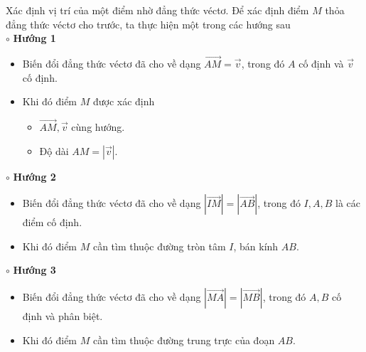 \begin{dang}{Xác định vị trí của một điểm nhờ đẳng thức véctơ.}
    Để xác định điểm $M$ thỏa đẳng thức véctơ cho trước, ta thực hiện một trong các hướng sau\\
$\circ$ \textbf{Hướng 1}
\begin{itemize}
    \item [$\bullet$] Biến đổi đẳng thức véctơ đã cho về dạng $\vec{AM}=\vec{v}$, trong đó $A$ cố định và $\vec{v}$ cố định.
    \item [$\bullet$] Khi đó điểm $M$ được xác định
    \begin{itemize}
        \item $\vec{AM},\vec{v}$ cùng hướng.
        \item Độ dài $AM= \left|\vec{v}\right|$.
    \end{itemize}
\end{itemize}
$\circ$ \textbf{Hướng 2}
\begin{itemize}
\item [$\bullet$] Biến đổi đẳng thức véctơ đã cho về dạng $\left\vert \vec{IM}\right\vert=\left\vert \vec{AB}\right\vert$, trong đó $I,A,B$ là các điểm cố định.
\item [$\bullet$] Khi đó điểm $M$ cần tìm thuộc đường tròn tâm $I$, bán kính $AB$.
\end{itemize}
$\circ$ \textbf{Hướng 3}
\begin{itemize}
    \item [$\bullet$] Biến đổi đẳng thức véctơ đã cho về dạng $\left\vert \vec{MA}\right\vert=\left\vert \vec{MB}\right\vert$, trong đó $A,B$ cố định và phân biệt.
    \item [$\bullet$] Khi đó điểm $M$ cần tìm thuộc đường trung trực của đoạn $AB$.
\end{itemize}
\end{dang}
